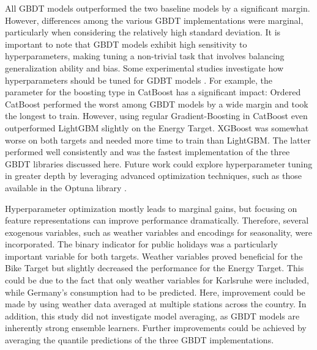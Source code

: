 All GBDT models outperformed the two baseline models by a significant margin. However, differences among the various GBDT implementations were marginal, particularly when considering the relatively high standard deviation. It is important to note that GBDT models exhibit high sensitivity to hyperparameters, making tuning a non-trivial task that involves balancing generalization ability and bias. Some experimental studies investigate how hyperparameters should be tuned for GDBT models \parencites{florek_benchmarking_2023, bentejac_comparative_2021}. For example, the parameter for the boosting type in CatBoost has a significant impact: Ordered CatBoost performed the worst among GBDT models by a wide margin and took the longest to train. However, using regular Gradient-Boosting in CatBoost even outperformed LightGBM slightly on the Energy Target. XGBoost was somewhat worse on both targets and needed more time to train than LightGBM. The latter performed well consistently and was the fastest implementation of the three GBDT libraries discussed here. Future work could explore hyperparameter tuning in greater depth by leveraging advanced optimization techniques, such as those available in the Optuna library \parencite{akiba_optuna_2019}.

Hyperparameter optimization mostly leads to marginal gains, but focusing on feature representations can improve performance dramatically. Therefore, several exogenous variables, such as weather variables and encodings for seasonality, were incorporated. The binary indicator for public holidays was a particularly important variable for both targets. Weather variables proved beneficial for the Bike Target but slightly decreased the performance for the Energy Target. This could be due to the fact that only weather variables for Karlsruhe were included, while Germany's consumption had to be predicted. Here, improvement could be made by using weather data averaged at multiple stations across the country. In addition, this study did not investigate model averaging, as GBDT models are inherently strong ensemble learners. Further improvements could be achieved by averaging the quantile predictions of the three GBDT implementations.

